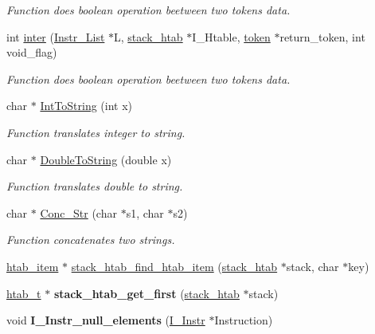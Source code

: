 \begin{DoxyCompactItemize}
\begin{DoxyCompactList}\small\item\em Function does boolean operation beetween two tokens data. \end{DoxyCompactList}\item 
int \hyperlink{group__interpret__processing_ga2136ced932cb2368bc956490eae226f1}{inter} (\hyperlink{structInstr__List}{Instr\+\_\+\+List} $\ast$L, \hyperlink{structstack__htab}{stack\+\_\+htab} $\ast$I\+\_\+\+Htable, \hyperlink{structtoken}{token} $\ast$return\+\_\+token, int void\+\_\+flag)
\begin{DoxyCompactList}\small\item\em Function does boolean operation beetween two tokens data. \end{DoxyCompactList}\item 
char $\ast$ \hyperlink{group__interpret__processing_ga5a0d1d664d0cfcc31c26179dd554bf4b}{Int\+To\+String} (int x)
\begin{DoxyCompactList}\small\item\em Function translates integer to string. \end{DoxyCompactList}\item 
char $\ast$ \hyperlink{group__interpret__processing_gab20c49a9d5c0ef5f59a1cf32a5fdccba}{Double\+To\+String} (double x)
\begin{DoxyCompactList}\small\item\em Function translates double to string. \end{DoxyCompactList}\item 
char $\ast$ \hyperlink{group__interpret__processing_ga932aeaa028a630ebe4e84383ff45008d}{Conc\+\_\+\+Str} (char $\ast$s1, char $\ast$s2)
\begin{DoxyCompactList}\small\item\em Function concatenates two strings. \end{DoxyCompactList}\item 
\hyperlink{structhtab__item}{htab\+\_\+item} $\ast$ \hyperlink{group__interpret__processing_ga600ab694c698a92ed71e4f88340e8870}{stack\+\_\+htab\+\_\+find\+\_\+htab\+\_\+item} (\hyperlink{structstack__htab}{stack\+\_\+htab} $\ast$stack, char $\ast$key)
\item 
\hyperlink{structhtab__t}{htab\+\_\+t} $\ast$ {\bfseries stack\+\_\+htab\+\_\+get\+\_\+first} (\hyperlink{structstack__htab}{stack\+\_\+htab} $\ast$stack)\hypertarget{group__interpret__processing_gac4f958bd4a853211be38f7cbab86247e}{}\label{group__interpret__processing_gac4f958bd4a853211be38f7cbab86247e}

\item 
void {\bfseries I\+\_\+\+Instr\+\_\+null\+\_\+elements} (\hyperlink{structI__Instr}{I\+\_\+\+Instr} $\ast$Instruction)\hypertarget{group__interpret__processing_gaa203349334ef66843a8ace3d31edf124}{}\label{group__interpret__processing_gaa203349334ef66843a8ace3d31edf124}

\end{DoxyCompactItemize}


